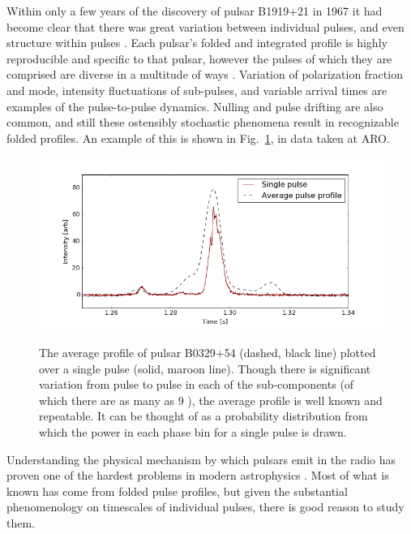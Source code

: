 Within only a few years of the discovery of pulsar B1919+21
in 1967 it had 
become clear that there was great variation between 
individual pulses, and 
even structure within pulses 
\citep{1968Natur.218.1122C, 1975ApJ...196...83M, 1975Natur.257..293R}. 
Each pulsar's folded and integrated profile 
is highly reproducible and specific to that pulsar, 
however the pulses of which they are comprised are 
diverse in a multitude of ways \citep{1998pulsarastronomy}. 
Variation of polarization fraction and mode, intensity 
fluctuations of sub-pulses, and variable arrival times 
are examples of the pulse-to-pulse dynamics. Nulling 
and pulse drifting are also common, and still these 
ostensibly stochastic phenomena result in recognizable 
folded profiles. An example of this is shown in 
Fig.~\ref{fig-pulse_outline}, in data taken at ARO. 

\begin{figure}[!h]
\begin{center}
\includegraphics[trim={0in 0in 0in 0in}, width=1\textwidth]{./figures/microstructure/B0329_average_single.png}
\vspace{0.0cm}
\caption{The average profile of pulsar B0329+54 (dashed, black line)
plotted over a single pulse (solid, maroon line). Though 
there is significant variation from pulse to pulse in 
each of the sub-components (of which there are 
as many as 9 \citep{2001ApJ...555...31G}), 
the average profile is 
well known and repeatable. It can be thought of as a 
probability distribution from which the power in each 
phase bin for a single pulse is drawn.}  
\vspace{-0.4cm}   
\label{fig-pulse_outline}
\end{center}
\end{figure}

Understanding the physical mechanism by which pulsars emit in the 
radio has proven one of the hardest problems 
in modern astrophysics \citep{1975ARA&A..13..511G, 2000ASPC..202..721M}. 
Most of what is known has come 
from folded pulse profiles, but given the substantial 
phenomenology on timescales of individual pulses, there 
is good reason to study them.

